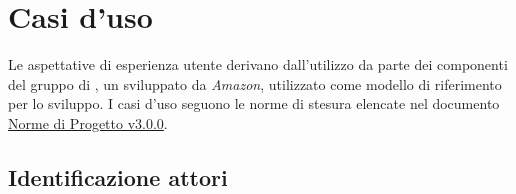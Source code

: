 \documentclass{scalatekids-article}
\begin{document}
\section{Casi d'uso}

Le aspettative di esperienza utente derivano dall'utilizzo da parte dei
componenti del gruppo di , un 
 sviluppato da \textit{Amazon}, utilizzato come modello di
riferimento per lo sviluppo. I casi d'uso seguono le norme di stesura elencate
nel documento \href{run:../Interni/NormeDiProgetto\_v3.0.0.pdf}{Norme di
  Progetto v3.0.0}.

\subsection{Identificazione attori}
\end{document}
